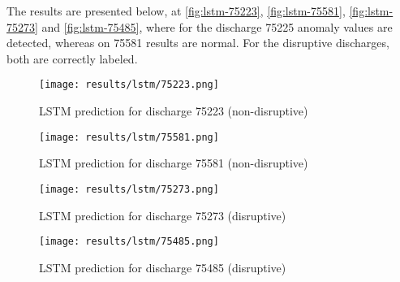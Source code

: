 The results are presented below, at \autoref{fig:lstm-75223}, \autoref{fig:lstm-75581}, \autoref{fig:lstm-75273} and \autoref{fig:lstm-75485}, where for the discharge 75225 anomaly values are detected, whereas on 75581 results are normal. For the disruptive discharges, both are correctly labeled.

\begin{figure}[H]
    \centering
    \texttt{[image: results/lstm/75223.png]}
    \caption{\ac{LSTM} prediction for discharge 75223 (non-disruptive)}
    \label{fig:lstm-75223}
\end{figure}

\begin{figure}[H]
    \centering
    \texttt{[image: results/lstm/75581.png]}
    \caption{\ac{LSTM} prediction for discharge 75581 (non-disruptive)}
    \label{fig:lstm-75581}
\end{figure}

\begin{figure}[H]
    \centering
    \texttt{[image: results/lstm/75273.png]}
    \caption{\ac{LSTM} prediction for discharge 75273 (disruptive)}
    \label{fig:lstm-75273}
\end{figure}

\begin{figure}[H]
    \centering
    \texttt{[image: results/lstm/75485.png]}
    \caption{\ac{LSTM} prediction for discharge 75485 (disruptive)}
    \label{fig:lstm-75485}
\end{figure}




